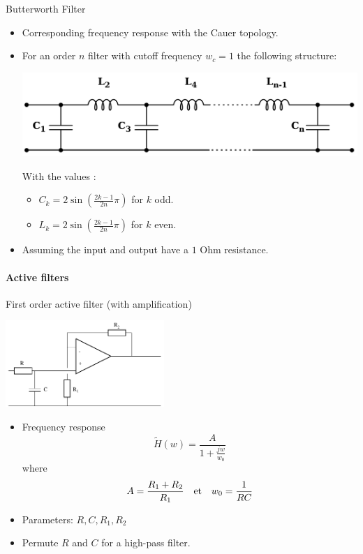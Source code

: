 \begin{block}{Butterworth Filter}
  \begin{itemize}
  \item Corresponding frequency response with the Cauer topology.
  \item For an order $n$ filter with cutoff frequency $w_c=1$ the following structure:
   \begin{center}
\includegraphics[width=.8\columnwidth]{imgs/fourier/Cauer_lowpass}
\end{center}
With the values :
\begin{itemize}
\item $C_k=2\sin(\frac{2k-1}{2n}\pi)$ for $k$ odd.
\item $L_k=2\sin(\frac{2k-1}{2n}\pi)$ for $k$ even.
\end{itemize}
\item Assuming the input and output have a $1$ Ohm resistance.
\end{itemize}
\end{block}

\paragraph{Active filters}

\begin{block}{First order active filter (with amplification)}

  \begin{center}
\includegraphics[width=6cm]{imgs/fourier/filtrage_actif_1o}

\begin{itemize}
\item Frequency response
$$\tilde H(w)=\frac{A}{1+\frac{jw}{w_0}}$$
where 
$$A= {\frac{R_1+R_2}{R_1}} \quad \text{et} \quad  w_0=  {\frac{1}{RC}}$$

\item Parameters: $R, C,R_1,R_2$
\item  Permute $R$ and $C$ for a high-pass filter.
\end{itemize}
\end{center}
\end{block}

